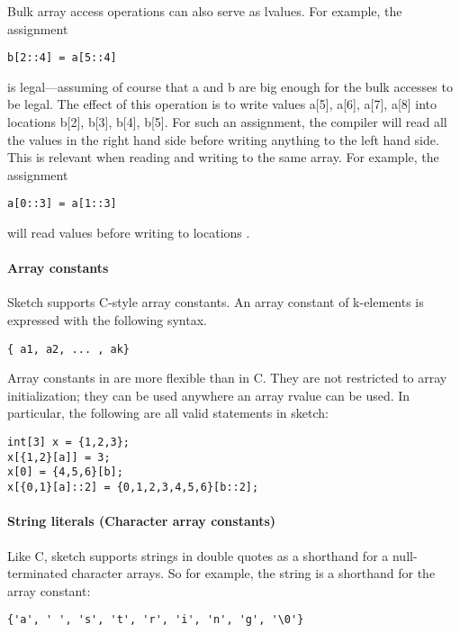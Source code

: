 Bulk array access operations can also serve as lvalues. For example, the assignment
\begin{lstlisting}
b[2::4] = a[5::4]
\end{lstlisting}
is legal---assuming of course that a and b are big enough for the bulk accesses to be legal. The effect of this operation is to write values a[5], a[6], a[7], a[8] into locations b[2], b[3], b[4], b[5]. For such an assignment, the compiler will read all the values in the right hand side before writing anything to the left hand side. This is relevant when reading and writing to the same array. For example, the assignment
\begin{lstlisting}
a[0::3] = a[1::3]
\end{lstlisting}
will read values   before writing to locations  .

\paragraph{Array constants}
Sketch supports C-style array constants. An array constant of k-elements is expressed with the following syntax.
\begin{lstlisting}
{ a1, a2, ... , ak}
\end{lstlisting}
Array constants in \Sk{} are more flexible than in C. They are not restricted to array initialization; they can be used anywhere an array rvalue can be used. In particular, the following are all valid statements in sketch:
\begin{lstlisting}
int[3] x = {1,2,3};
x[{1,2}[a]] = 3;
x[0] = {4,5,6}[b];
x[{0,1}[a]::2] = {0,1,2,3,4,5,6}[b::2];
\end{lstlisting}

\paragraph{String literals (Character array constants)}
Like C, sketch supports strings in double quotes as a shorthand for a null-terminated character arrays. So for example, the string  is a shorthand for the array constant:
\begin{lstlisting}
{'a', ' ', 's', 't', 'r', 'i', 'n', 'g', '\0'}
\end{lstlisting}


